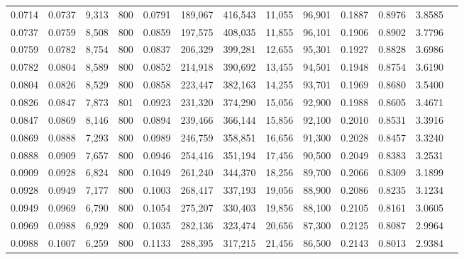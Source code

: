 \begin{tabular}{rrrrrrrrrrrrr}
0.0714 & 0.0737 &  9,313 &   800 &                                     0.0791 & 189,067 & 416,543 &  11,055 &  96,901 & 0.1887 & 0.8976 & 3.8585 \\
0.0737 & 0.0759 &  8,508 &   800 &                                     0.0859 & 197,575 & 408,035 &  11,855 &  96,101 & 0.1906 & 0.8902 & 3.7796 \\
0.0759 & 0.0782 &  8,754 &   800 &                                     0.0837 & 206,329 & 399,281 &  12,655 &  95,301 & 0.1927 & 0.8828 & 3.6986 \\
0.0782 & 0.0804 &  8,589 &   800 &                                     0.0852 & 214,918 & 390,692 &  13,455 &  94,501 & 0.1948 & 0.8754 & 3.6190 \\
0.0804 & 0.0826 &  8,529 &   800 &                                     0.0858 & 223,447 & 382,163 &  14,255 &  93,701 & 0.1969 & 0.8680 & 3.5400 \\
0.0826 & 0.0847 &  7,873 &   801 &                                     0.0923 & 231,320 & 374,290 &  15,056 &  92,900 & 0.1988 & 0.8605 & 3.4671 \\
0.0847 & 0.0869 &  8,146 &   800 &                                     0.0894 & 239,466 & 366,144 &  15,856 &  92,100 & 0.2010 & 0.8531 & 3.3916 \\
0.0869 & 0.0888 &  7,293 &   800 &                                     0.0989 & 246,759 & 358,851 &  16,656 &  91,300 & 0.2028 & 0.8457 & 3.3240 \\
0.0888 & 0.0909 &  7,657 &   800 &                                     0.0946 & 254,416 & 351,194 &  17,456 &  90,500 & 0.2049 & 0.8383 & 3.2531 \\
0.0909 & 0.0928 &  6,824 &   800 &                                     0.1049 & 261,240 & 344,370 &  18,256 &  89,700 & 0.2066 & 0.8309 & 3.1899 \\
0.0928 & 0.0949 &  7,177 &   800 &                                     0.1003 & 268,417 & 337,193 &  19,056 &  88,900 & 0.2086 & 0.8235 & 3.1234 \\
0.0949 & 0.0969 &  6,790 &   800 &                                     0.1054 & 275,207 & 330,403 &  19,856 &  88,100 & 0.2105 & 0.8161 & 3.0605 \\
0.0969 & 0.0988 &  6,929 &   800 &                                     0.1035 & 282,136 & 323,474 &  20,656 &  87,300 & 0.2125 & 0.8087 & 2.9964 \\
0.0988 & 0.1007 &  6,259 &   800 &                                     0.1133 & 288,395 & 317,215 &  21,456 &  86,500 & 0.2143 & 0.8013 & 2.9384 \\

\end{tabular}
